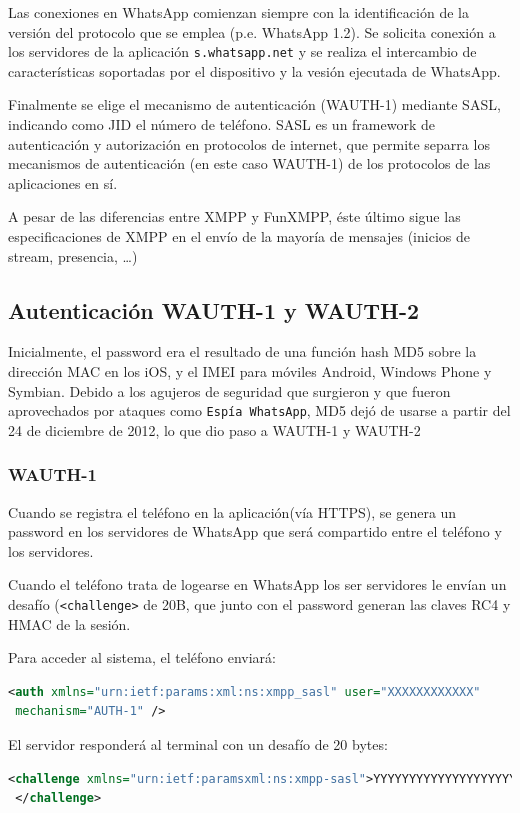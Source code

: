 \documentclass[a4paper, 11pt]{article} %
\begin{document}
Las conexiones en WhatsApp comienzan siempre con la identificación de la versión del protocolo que se emplea (p.e. 
WhatsApp 1.2). Se solicita conexión a los servidores de la aplicación \texttt{s.whatsapp.net} y se realiza el intercambio
de características soportadas por el dispositivo y la vesión ejecutada de WhatsApp.

Finalmente se elige el mecanismo de autenticación (WAUTH-1) mediante SASL, indicando como JID el número de teléfono.
SASL es un framework de autenticación y autorización en protocolos de internet, que permite separra los mecanismos de
autenticación (en este caso WAUTH-1) de los protocolos de las aplicaciones en sí.

A pesar de las diferencias entre XMPP y FunXMPP, éste último sigue las especificaciones de XMPP en el envío de la
mayoría de mensajes (inicios de stream, presencia, \ldots)

\subsection{Autenticación WAUTH-1 y WAUTH-2}
Inicialmente, el password era el resultado de una función hash MD5 sobre la dirección MAC en los iOS, y el IMEI para
móviles Android, Windows Phone y Symbian.
Debido a los agujeros de seguridad que surgieron y que fueron aprovechados por ataques como \texttt{Espía WhatsApp},
MD5 dejó de usarse a partir del 24 de diciembre de 2012, lo que dio paso a WAUTH-1 y WAUTH-2

\subsubsection{WAUTH-1}
Cuando se registra el teléfono en la aplicación(vía HTTPS), se genera un password en los servidores de WhatsApp que será compartido
entre el teléfono y los servidores.

Cuando el teléfono trata de logearse en WhatsApp los ser servidores le envían un desafío (\texttt{<challenge>} de 20B, que junto con el
password generan las claves RC4 y HMAC de la sesión. 

Para acceder al sistema, el teléfono enviará:
\begin{lstlisting}[language=XML]
 <auth xmlns="urn:ietf:params:xml:ns:xmpp_sasl" user="XXXXXXXXXXXX"
 mechanism="AUTH-1" />
\end{lstlisting}

El servidor responderá al terminal con un desafío de 20 bytes:
\begin{lstlisting}[language=XML]
 <challenge xmlns="urn:ietf:paramsxml:ns:xmpp-sasl">YYYYYYYYYYYYYYYYYYYY
 </challenge>
\end{lstlisting}
\end{document}
